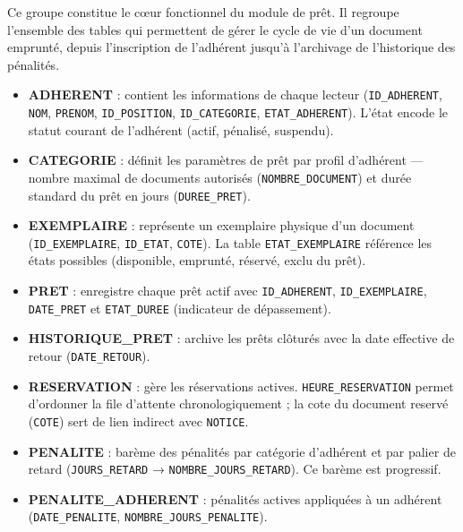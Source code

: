 Ce groupe constitue le cœur fonctionnel du module de prêt. Il regroupe
l'ensemble des tables qui permettent de gérer le cycle de vie d'un document
emprunté, depuis l'inscription de l'adhérent jusqu'à l'archivage de
l'historique des pénalités.
\newpage
\begin{itemize}
    \item \textbf{ADHERENT} : contient les informations de chaque lecteur
    (\texttt{ID\_ADHERENT}, \texttt{NOM}, \texttt{PRENOM},
    \texttt{ID\_POSITION}, \texttt{ID\_CATEGORIE}, \texttt{ETAT\_ADHERENT}).
    L'état encode le statut courant de l'adhérent (actif, pénalisé, suspendu).

    \item \textbf{CATEGORIE} : définit les paramètres de prêt par profil
    d'adhérent — nombre maximal de documents autorisés
    (\texttt{NOMBRE\_DOCUMENT}) et durée standard du prêt en jours
    (\texttt{DUREE\_PRET}).

    \item \textbf{EXEMPLAIRE} : représente un exemplaire physique d'un
    document (\texttt{ID\_EXEMPLAIRE}, \texttt{ID\_ETAT}, \texttt{COTE}).
    La table \texttt{ETAT\_EXEMPLAIRE} référence les états possibles
    (disponible, emprunté, réservé, exclu du prêt).

    \item \textbf{PRET} : enregistre chaque prêt actif avec
    \texttt{ID\_ADHERENT}, \texttt{ID\_EXEMPLAIRE}, \texttt{DATE\_PRET} et
    \texttt{ETAT\_DUREE} (indicateur de dépassement).

    \item \textbf{HISTORIQUE\_PRET} : archive les prêts clôturés avec la date
    effective de retour (\texttt{DATE\_RETOUR}).

    \item \textbf{RESERVATION} : gère les réservations actives.
    \texttt{HEURE\_RESERVATION} permet d'ordonner la file d'attente
    chronologiquement ; la cote du document reservé (\texttt{COTE}) sert de lien
    indirect avec \texttt{NOTICE}.

    \item \textbf{PENALITE} : barème des pénalités par catégorie d'adhérent
    et par palier de retard (\texttt{JOURS\_RETARD} →
    \texttt{NOMBRE\_JOURS\_RETARD}). Ce barème est progressif.

    \item \textbf{PENALITE\_ADHERENT} : pénalités actives appliquées à un
    adhérent (\texttt{DATE\_PENALITE}, \texttt{NOMBRE\_JOURS\_PENALITE}).


\end{itemize}
